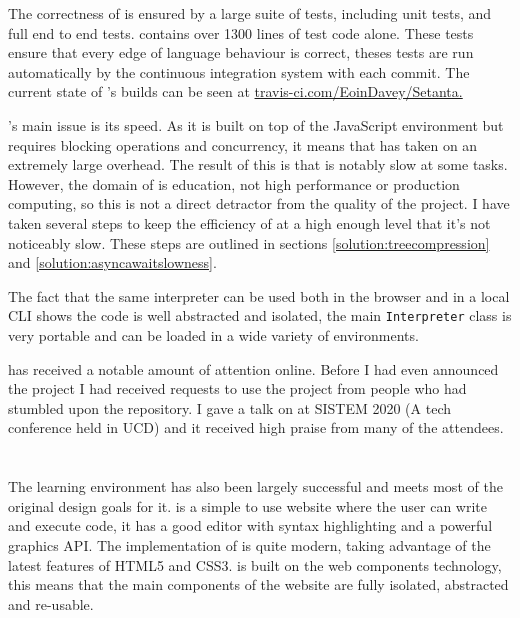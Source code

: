 The correctness of \Setanta{} is ensured by a large suite of tests, including unit tests, and full end to end tests. \Setanta{} contains over 1300 lines of test code alone. These tests ensure that every edge of language behaviour is correct, theses tests are run automatically by the continuous integration system with each commit. The current state of \Setanta{}'s builds can be seen at \href{https://travis-ci.com/EoinDavey/Setanta}{travis-ci.com/EoinDavey/Setanta.}

\Setanta{}'s main issue is its speed. As it is built on top of the JavaScript environment but requires blocking operations and concurrency, it means that \Setanta{} has taken on an extremely large overhead. The result of this is that \Setanta{} is notably slow at some tasks. However, the domain of \Setanta{} is education, not high performance or production computing, so this is not a direct detractor from the quality of the project. I have taken several steps to keep the efficiency of \Setanta{} at a high enough level that it's not noticeably slow.
These steps are outlined in sections \ref{solution:treecompression} and \ref{solution:asyncawaitslowness}.

The fact that the same \Setanta{} interpreter can be used both in the browser and in a local CLI shows the code is well abstracted and isolated, the main \lstinline|Interpreter| class is very portable and can be loaded in a wide variety of environments.

\Setanta{} has received a notable amount of attention online. Before I had even announced the project I had received requests to use the project from people who had stumbled upon the repository. I gave a talk on \Setanta{} at SISTEM 2020 (A tech conference held in UCD) and it received high praise from many of the attendees.

\section{\trys{}}

The \trys{} learning environment has also been largely successful and meets most of the original design goals for it. \trys{} is a simple to use website where the user can write and execute \Setanta{} code, it has a good editor with syntax highlighting and a powerful graphics API.
The implementation of \trys{} is quite modern, taking advantage of the latest features of HTML5 and CSS3. \trys{} is built on the web components technology, this means that the main components of the \trys{} website are fully isolated, abstracted and re-usable.

